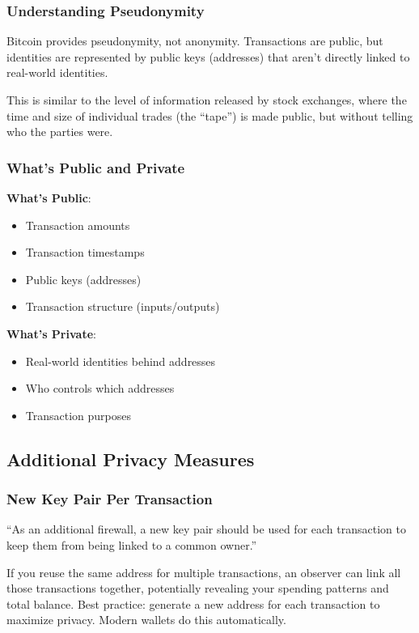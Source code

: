 \subsubsection{Understanding Pseudonymity}

Bitcoin provides pseudonymity, not anonymity. Transactions are public, but identities are represented by public keys (addresses) that aren't directly linked to real-world identities.

This is similar to the level of information released by stock exchanges, where the time and size of individual trades (the ``tape'') is made public, but without telling who the parties were.

\subsubsection{What's Public and Private}

\textbf{What's Public}:
\begin{itemize}
  \item Transaction amounts
  \item Transaction timestamps
  \item Public keys (addresses)
  \item Transaction structure (inputs/outputs)
\end{itemize}

\textbf{What's Private}:
\begin{itemize}
  \item Real-world identities behind addresses
  \item Who controls which addresses
  \item Transaction purposes
\end{itemize}

\subsection{Additional Privacy Measures}
\label{subsec:additional-privacy}

\subsubsection{New Key Pair Per Transaction}

``As an additional firewall, a new key pair should be used for each transaction to keep them from being linked to a common owner.''

If you reuse the same address for multiple transactions, an observer can link all those transactions together, potentially revealing your spending patterns and total balance. Best practice: generate a new address for each transaction to maximize privacy. Modern wallets do this automatically.

